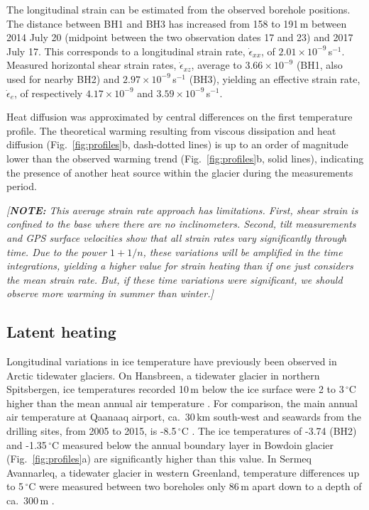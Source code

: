 \documentclass[utf8]{article}
\newcommand{\note}[1]{\textcolor{c0}{\emph{[\textbf{NOTE:} #1]}}}
\begin{document}
    The longitudinal strain can be estimated from the observed borehole
    positions. The distance between BH1 and BH3
    has increased from 158 to 191\,m between 2014 July 20 (midpoint
    between the two observation dates 17 and 23) and 2017 July 17. This
    corresponds to a longitudinal strain rate, $\dot\epsilon_{xx}$, of
    $2.01\times10^{-9}$\,s$^{-1}$. Measured horizontal shear strain rates,
    $\dot\epsilon_{xz}$, average to $3.66\times10^{-9}$ (BH1, also used for
    nearby BH2) and $2.97\times10^{-9}$\,s$^{-1}$ (BH3), yielding an effective
    strain rate, $\dot\epsilon_e$, of respectively $4.17\times10^{-9}$ and
    $3.59\times10^{-9}$\,s$^{-1}$.

    Heat diffusion was approximated by central differences on the first
    temperature profile. The theoretical warming resulting from viscous
    dissipation and heat diffusion (Fig.~\ref{fig:profiles}b, dash-dotted
    lines) is up to an order of magnitude lower than the observed warming
    trend (Fig.~\ref{fig:profiles}b, solid lines), indicating the presence of
    another heat source within the glacier during the measurements period.

    \note{This average strain rate approach has limitations. First, shear
          strain is confined to the base where there are no inclinometers.
          Second, tilt measurements and GPS surface velocities show that all
          strain rates vary significantly through time. Due to the power
          $1+1/n$, these variations will be amplified in the time integrations,
          yielding a higher value for strain heating than if one just considers
          the mean strain rate. But, if these time variations were significant,
          we should observe more warming in summer than winter.}


\subsection{Latent heating}

    Longitudinal variations in ice temperature have previously been observed in
    Arctic tidewater glaciers. On Hansbreen, a tidewater glacier in northern
    Spitsbergen, ice temperatures recorded 10\,m below the ice surface were 2
    to 3\,$^\circ$C higher than the mean annual air temperature
    \citep{Jania.etal.1996}.
    For comparison, the main annual air temperature at Qaanaaq airport,
    ca.~30\,km south-west and seawards from the drilling sites, from 2005 to
    2015, is -8.5\,$^\circ$C \citep{Sugiyama.etal.2014, Tsutaki.etal.2017}. The
    ice temperatures of -3.74 (BH2) and -1.35\,$^\circ$C measured below the annual
    boundary layer in Bowdoin glacier (Fig.~\ref{fig:profiles}a) are
    significantly higher than this value. In Sermeq Avannarleq, a tidewater
    glacier in
    western Greenland, temperature differences up to 5\,$^\circ$C were measured
    between two boreholes only 86\,m apart down to a depth of ca.~300\,m
    \citep{Luthi.etal.2015}.
\end{document}
